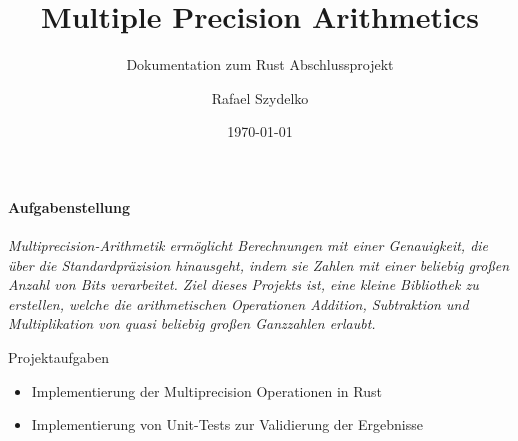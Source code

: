 \documentclass[11pt,parskip=half]{scrartcl} %
\title{Multiple Precision Arithmetics}
\subtitle{Dokumentation zum Rust Abschlussprojekt}
\author{Rafael Szydelko}
\begin{document}
\date{\today}
\maketitle

\paragraph{Aufgabenstellung}
    {\slshape
        Multiprecision-Arithmetik ermöglicht Berechnungen mit einer Genauigkeit, die über
        die Standardpräzision hinausgeht, indem sie Zahlen mit einer beliebig großen Anzahl von
        Bits verarbeitet. Ziel dieses Projekts ist, eine kleine Bibliothek zu erstellen, welche die
        arithmetischen Operationen Addition, Subtraktion und Multiplikation von quasi beliebig
        großen Ganzzahlen erlaubt.

        Projektaufgaben
        \begin{itemize}
            \tightlist
            \item Implementierung der Multiprecision Operationen in Rust
            \item Implementierung von Unit-Tests zur Validierung der Ergebnisse
        \end{itemize}
    }

\tableofcontents















\end{document}
